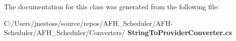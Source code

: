 The documentation for this class was generated from the following file\+:\begin{DoxyCompactItemize}
\item 
C\+:/\+Users/jnestoss/source/repos/\+A\+F\+H\+\_\+\+Scheduler/\+A\+F\+H-\/\+Scheduler/\+A\+F\+H\+\_\+\+Scheduler/\+Converters/\textbf{ String\+To\+Provider\+Converter.\+cs}\end{DoxyCompactItemize}
